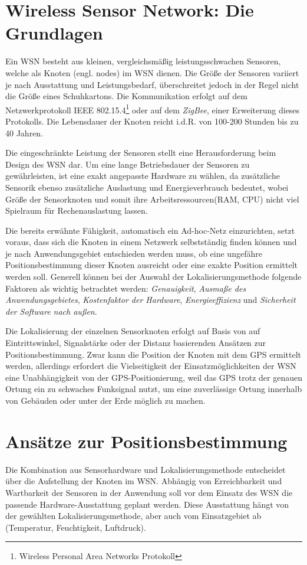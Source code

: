 \documentclass[12pt, a4wide]{scrreprt}
\begin{document}
\chapter{Wireless Sensor Network: Die Grundlagen}
Ein WSN besteht aus kleinen, vergleichsmäßig leistungsschwachen Sensoren, welche als Knoten (engl. nodes) im WSN dienen. Die Größe der Sensoren variiert je nach Ausstattung und Leistungsbedarf, überschreitet jedoch in der Regel nicht die Größe eines Schuhkartons. Die Kommunikation erfolgt auf dem Netzwerkprotokoll IEEE 802.15.4\footnote{Wireless Personal Area Networks Protokoll} oder auf dem \textit{ZigBee}, einer Erweiterung dieses Protokolls\cite{patwari_locating}.
Die Lebensdauer der Knoten reicht i.d.R. von 100-200 Stunden\cite{lifetime_study} bis zu 40 Jahren\cite{lisocl}.

Die eingeschränkte Leistung der Sensoren stellt eine Herausforderung beim Design des WSN dar. Um eine lange Betriebsdauer der Sensoren zu gewährleisten, ist eine exakt angepasste Hardware zu wählen, da zusätzliche Sensorik ebenso zusätzliche Auslastung und Energieverbrauch bedeutet, wobei Größe der Sensorknoten und somit ihre Arbeitsressourcen(RAM, CPU) nicht viel Spielraum für Rechenauslastung lassen.

Die bereits erwähnte Fähigkeit, automatisch ein Ad-hoc-Netz einzurichten, setzt voraus, dass sich die Knoten in einem Netzwerk selbstständig finden können und je nach Anwendungsgebiet entschieden werden muss, ob eine ungefähre Positionsbestimmung dieser Knoten ausreicht oder eine exakte Position ermittelt werden soll. Generell können bei der Auswahl der Lokalisierungsmethode folgende Faktoren als wichtig betrachtet werden: \textit{Genauigkeit}, \textit{Ausmaße des Anwendungsgebietes}, \textit{Kostenfaktor der Hardware}, \textit{Energieeffizienz} und \textit{Sicherheit der Software nach außen}\cite{indoor_localization}.

Die Lokalisierung der einzelnen Sensorknoten erfolgt auf Basis von auf Eintrittswinkel, Signalstärke oder der Distanz basierenden Ansätzen zur Positionsbestimmung. Zwar kann die Position der Knoten mit dem GPS ermittelt werden, allerdings erfordert die Vielseitigkeit der Einsatzmöglichkeiten der WSN eine Unabhängigkeit von der GPS-Positionierung, weil das GPS trotz der genauen Ortung ein zu schwaches Funksignal nutzt, um eine zuverlässige  Ortung innerhalb von Gebäuden oder unter der Erde möglich zu machen.

\chapter{Ansätze zur Positionsbestimmung}
Die Kombination aus Sensorhardware und Lokalisierungsmethode entscheidet über die Aufstellung der Knoten im \acs{WSN}. Abhängig von  Erreichbarkeit und Wartbarkeit der Sensoren in der Anwendung soll vor dem Einsatz des WSN die passende Hardware-Ausstattung geplant werden. Diese Ausstattung hängt von der gewählten Lokalisierungsmethode, aber auch vom Einsatzgebiet ab (Temperatur, Feuchtigkeit, Luftdruck).
\end{document}
